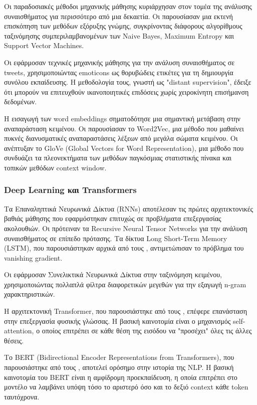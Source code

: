 \documentclass[a4paper,11pt,oneside,openany]{ioniothesis}
\begin{document}
Οι παραδοσιακές μέθοδοι μηχανικής μάθησης κυριάρχησαν στον τομέα της ανάλυσης συναισθήματος για περισσότερο από μια δεκαετία. Οι \cite{pang2008opinion} παρουσίασαν μια εκτενή επισκόπηση των μεθόδων εξόρυξης γνώμης, συγκρίνοντας διάφορους αλγορίθμους ταξινόμησης συμπεριλαμβανομένων των Naive Bayes, Maximum Entropy και Support Vector Machines.

Οι \cite{go2009twitter} εφάρμοσαν τεχνικές μηχανικής μάθησης για την ανάλυση συναισθήματος σε tweets, χρησιμοποιώντας emoticons ως θορυβώδεις ετικέτες για τη δημιουργία συνόλου εκπαίδευσης. Η μεθοδολογία τους, γνωστή ως "distant supervision", έδειξε ότι μπορούν να επιτευχθούν ικανοποιητικές επιδόσεις χωρίς χειροκίνητη επισήμανση δεδομένων.

Η εισαγωγή των word embeddings σηματοδότησε μια σημαντική μετάβαση στην αναπαράσταση κειμένου. Οι \cite{mikolov2013distributed} παρουσίασαν το Word2Vec, μια μέθοδο που μαθαίνει πυκνές διανυσματικές αναπαραστάσεις λέξεων από μεγάλα σώματα κειμένου. Οι \cite{pennington2014glove} ανέπτυξαν το GloVe (Global Vectors for Word Representation), μια μέθοδο που συνδυάζει τα πλεονεκτήματα των μεθόδων παγκόσμιας στατιστικής πίνακα και τοπικών μεθόδων context window.

\subsubsection{Deep Learning και Transformers}
\label{sec:Deep learning και Transformers}

Τα Επαναληπτικά Νευρωνικά Δίκτυα (RNNs) αποτέλεσαν τις πρώτες αρχιτεκτονικές βαθιάς μάθησης που εφαρμόστηκαν επιτυχώς σε προβλήματα επεξεργασίας ακολουθιών. Οι \cite{socher2013recursive} πρότειναν τα Recursive Neural Tensor Networks για την ανάλυση συναισθήματος σε επίπεδο πρότασης. Τα δίκτυα Long Short-Term Memory (LSTM), που παρουσιάστηκαν αρχικά από τους \cite{hochreiter1997long}, αντιμετώπισαν το πρόβλημα του vanishing gradient.

Οι \cite{kim2014convolutional} εφάρμοσαν Συνελικτικά Νευρωνικά Δίκτυα στην ταξινόμηση κειμένου, χρησιμοποιώντας πολλαπλά φίλτρα διαφορετικών μεγεθών για την εξαγωγή n-gram χαρακτηριστικών.

Η αρχιτεκτονική Transformer, που παρουσιάστηκε από τους \cite{vaswani2017attention}, επέφερε επανάσταση στην επεξεργασία φυσικής γλώσσας. Η βασική καινοτομία είναι ο μηχανισμός self-attention, ο οποίος επιτρέπει σε κάθε θέση της εισόδου να "προσέχει" όλες τις άλλες θέσεις.

Το BERT (Bidirectional Encoder Representations from Transformers), που παρουσιάστηκε από τους \cite{devlin2018bert}, αποτελεί ορόσημο στην ιστορία της NLP. Η βασική καινοτομία του BERT είναι η αμφίδρομη προεκπαίδευση, η οποία επιτρέπει στο μοντέλο να λαμβάνει υπόψη τόσο το αριστερό όσο και το δεξιό context κάθε token ταυτόχρονα.
\end{document}
